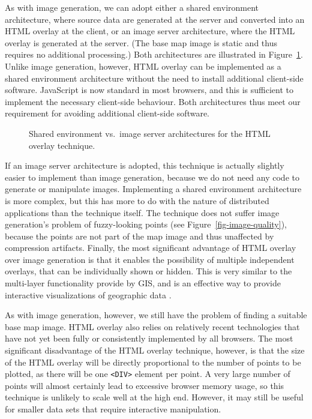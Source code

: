\documentclass[acmtocl,acmnow]{acmtrans2m}
\begin{document}
As with image generation, we can adopt either a shared environment
architecture, where source data are generated at the server and
converted into an HTML overlay at the client, or an image server
architecture, where the HTML overlay is generated at the server. (The
base map image is static and thus requires no additional processing.)
Both architectures are illustrated in
Figure~\ref{fig-html-architectures}. Unlike image generation, however,
HTML overlay can be implemented as a shared environment architecture
without the need to install additional client-side software. JavaScript
is now standard in most browsers, and this is sufficient to implement
the necessary client-side behaviour. Both architectures thus meet our
requirement for avoiding additional client-side software.


\begin{figure}
	\caption{Shared environment vs.\ image server architectures for the
	HTML overlay technique.}
	\label{fig-html-architectures}
\end{figure}


If an image server architecture is adopted, this technique is actually
slightly easier to implement than image generation, because we do not
need any code to generate or manipulate images. Implementing a shared
environment architecture is more complex, but this has more to do with
the nature of distributed applications than the technique itself. The
technique does not suffer image generation's problem of fuzzy-looking
points (see Figure~\ref{fig-image-quality}), because the points are not
part of the map image and thus unaffected by compression artifacts.
Finally, the most significant advantage of HTML overlay over image
generation is that it enables the possibility of multiple independent
overlays, that can be individually shown or hidden. This is very similar
to the multi-layer functionality provide by GIS, and is an effective way
to provide interactive visualizations of geographic data
\cite{Wood-J-1996-vis,MacE-AM-1998-GIS}.

As with image generation, however, we still have the problem of finding
a suitable base map image. HTML overlay also relies on relatively recent
technologies that have not yet been fully or consistently implemented by
all browsers. The most significant disadvantage of the HTML overlay
technique, however, is that the size of the HTML overlay will be
directly proportional to the number of points to be plotted, as there
will be one \verb|<DIV>| element per point. A very large number of
points will almost certainly lead to excessive browser memory usage, so
this technique is unlikely to scale well at the high end. However, it
may still be useful for smaller data sets that require interactive
manipulation.
\end{document}
